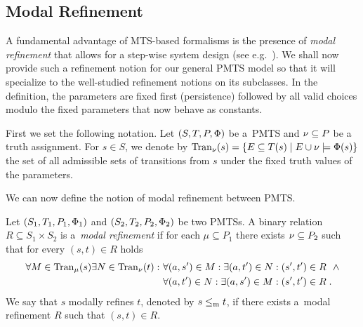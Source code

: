 \subsection{Modal Refinement}\label{ss:ref}

A fundamental advantage of MTS-based formalisms is the presence of 
\emph{modal refinement} 
that allows for a step-wise system design (see e.g.~\cite{AHLNW:EATCS:08}).
We shall now provide such a refinement notion for
our general PMTS model so that it will specialize to the well-studied
refinement notions on its subclasses. In the definition,
the parameters are fixed first (persistence) followed by 
all valid choices modulo the fixed parameters that now behave as
constants. %

First we set the following notation.
Let $(S,T,P,\mathrm{\Phi})$ be a~PMTS and $\nu \subseteq P$ be 
a truth assignment. For $s \in S$, we denote 
by $\mathrm{Tran}_{\nu}(s) = \{ E \subseteq T(s) \mid E \cup \nu 
\models \mathrm{\Phi}(s)\}$ the set of all admissible sets of transitions from $s$
under the fixed truth values of the parameters.

We can now define the notion of modal refinement between PMTS.

\begin{definition}\label{def:pers-mr}
Let $(S_1,T_1,P_1,\mathrm{\Phi}_1)$ and $(S_2,T_2,P_2,\mathrm{\Phi}_2)$ be two PMTSs. 
A binary relation
$R \subseteq S_1 \times S_2$ is a~\emph{modal refinement} if 
for each $\mu \subseteq P_1$ there exists $\nu \subseteq P_2$
such that for every $(s,t) \in R$ holds %
\begin{align*}  
 \forall M \in \mathrm{Tran}_{\mu}(s) \exists N \in \mathrm{Tran}_{\nu}(t) : 
        & \ \forall (a,s') \in M : \exists (a,t') \in N : (s',t') \in R \ \ \wedge \\
                &\ \forall (a,t') \in N : \exists (a,s') \in M : (s',t') \in R\;.
\end{align*}
We say that $s$ modally refines $t$, denoted by $s \le_\mathrm m t$, if there
exists a~modal refinement $R$ such that $(s,t) \in R$.
\end{definition}

